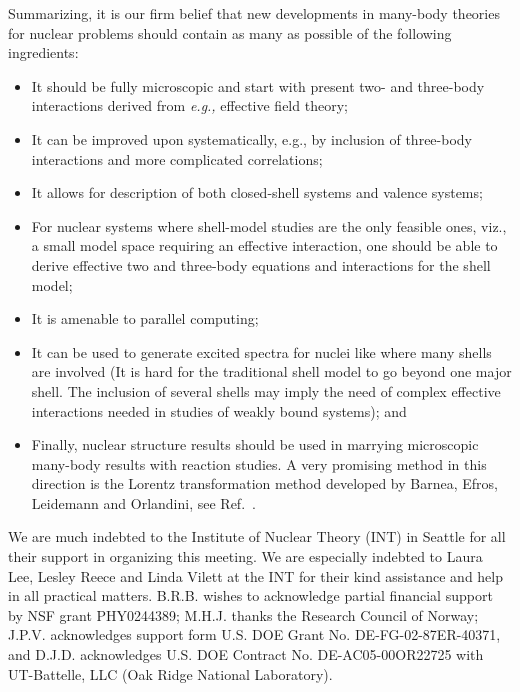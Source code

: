 \documentclass[12pt]{iopart}
\begin{document}
Summarizing, it is our firm belief 
that new developments in many-body theories
for nuclear problems should contain as many as possible of the 
following ingredients:
\begin{itemize}
\item
It should be fully microscopic and start with present two- and three-body
interactions derived from {\it e.g.,} effective field theory;
\item It can be improved upon systematically, e.g., by inclusion of
three-body interactions and more complicated correlations;
\item It allows for description of both closed-shell 
systems and valence systems;
\item For nuclear systems where shell-model studies are the only feasible ones,
viz., a small model space requiring an effective interaction, 
one should be able to
derive  effective two and three-body 
equations and interactions for the shell
model;
\item It is amenable to parallel computing;
\item It can be used to generate excited spectra for nuclei like 
where many shells are involved (It is hard for the traditional shell model
to go beyond one major shell.  The inclusion of several shells may imply 
the need of  complex effective interactions
needed in studies of weakly bound systems); and
\item Finally, nuclear structure results should be used in marrying microscopic 
many-body results with reaction studies. A very promising method 
in this direction is the Lorentz transformation
method developed by Barnea, Efros, 
Leidemann and Orlandini, see Ref.~\cite{giusi}.
\end{itemize}


\ack
We are much indebted to the Institute of Nuclear Theory (INT) in Seattle for 
all their support
in organizing this meeting. We are especially indebted 
to Laura Lee, Lesley Reece and Linda Vilett at the INT for their 
kind assistance and help in all practical matters. 
B.R.B. wishes to acknowledge partial financial support by NSF grant
PHY0244389; M.H.J. thanks the Research Council of Norway; J.P.V. 
acknowledges support form U.S. DOE Grant No. DE-FG-02-87ER-40371, and 
D.J.D. acknowledges U.S. DOE Contract No. DE-AC05-00OR22725 with UT-Battelle,
LLC (Oak Ridge National Laboratory). 
\end{document}
